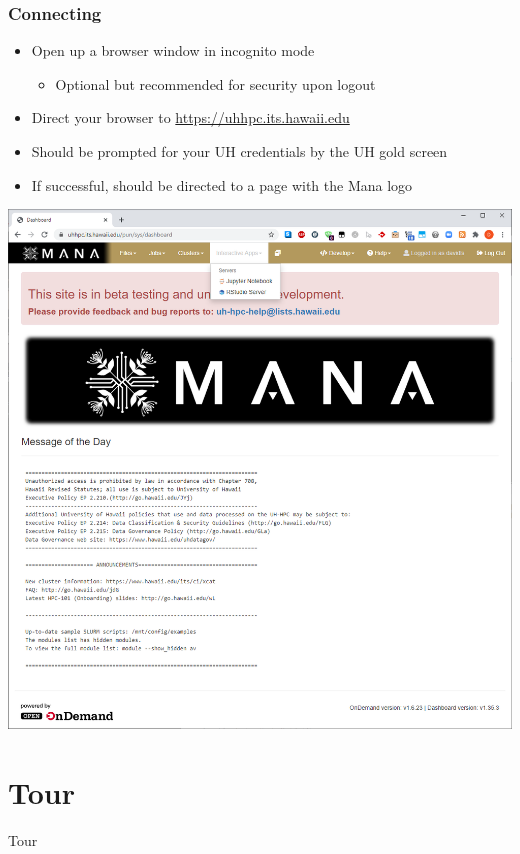 \begin{frame}
\frametitle{Connecting}
			\begin{itemize}
				\item Open up a browser window in incognito mode
					\begin{itemize}
					\item Optional but recommended for security upon logout
					\end{itemize}						
				\item Direct your browser to \url{https://uhhpc.its.hawaii.edu}
				\item Should be prompted for your UH credentials by the UH gold screen
				\item If successful, should be directed to a page with the Mana logo
			\end{itemize}
	\begin{center}
  \includegraphics[scale=0.15]{05.png}
	\end{center}			
\end{frame}

\section[WT]{Tour}
\begin{frame}
\Huge{\centerline{Tour}}
\end{frame}

